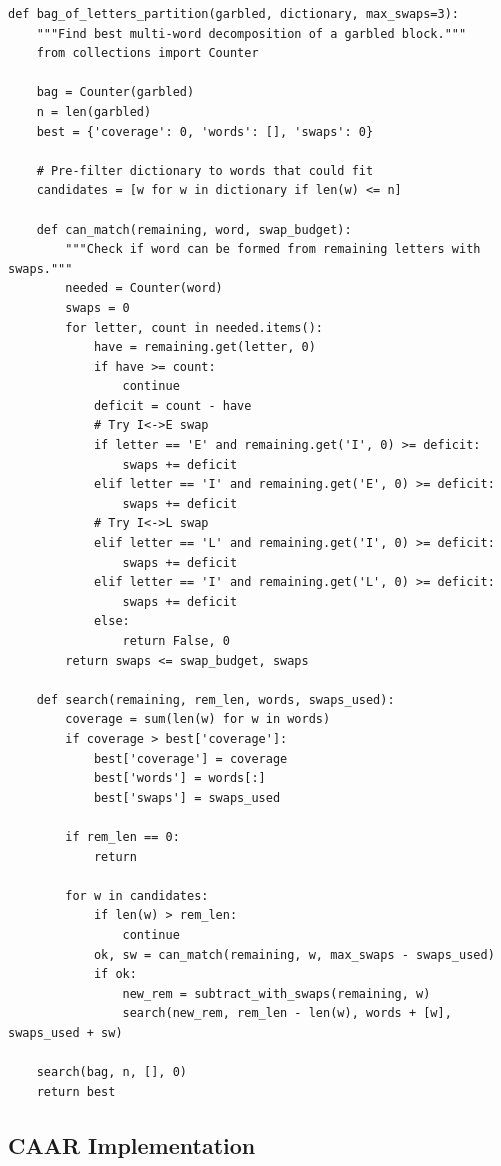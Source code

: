 \documentclass[11pt,a4paper]{article}
\begin{document}
\begin{lstlisting}[style=python]
def bag_of_letters_partition(garbled, dictionary, max_swaps=3):
    """Find best multi-word decomposition of a garbled block."""
    from collections import Counter

    bag = Counter(garbled)
    n = len(garbled)
    best = {'coverage': 0, 'words': [], 'swaps': 0}

    # Pre-filter dictionary to words that could fit
    candidates = [w for w in dictionary if len(w) <= n]

    def can_match(remaining, word, swap_budget):
        """Check if word can be formed from remaining letters with swaps."""
        needed = Counter(word)
        swaps = 0
        for letter, count in needed.items():
            have = remaining.get(letter, 0)
            if have >= count:
                continue
            deficit = count - have
            # Try I<->E swap
            if letter == 'E' and remaining.get('I', 0) >= deficit:
                swaps += deficit
            elif letter == 'I' and remaining.get('E', 0) >= deficit:
                swaps += deficit
            # Try I<->L swap
            elif letter == 'L' and remaining.get('I', 0) >= deficit:
                swaps += deficit
            elif letter == 'I' and remaining.get('L', 0) >= deficit:
                swaps += deficit
            else:
                return False, 0
        return swaps <= swap_budget, swaps

    def search(remaining, rem_len, words, swaps_used):
        coverage = sum(len(w) for w in words)
        if coverage > best['coverage']:
            best['coverage'] = coverage
            best['words'] = words[:]
            best['swaps'] = swaps_used

        if rem_len == 0:
            return

        for w in candidates:
            if len(w) > rem_len:
                continue
            ok, sw = can_match(remaining, w, max_swaps - swaps_used)
            if ok:
                new_rem = subtract_with_swaps(remaining, w)
                search(new_rem, rem_len - len(w), words + [w], swaps_used + sw)

    search(bag, n, [], 0)
    return best
\end{lstlisting}

\subsection{CAAR Implementation}
\end{document}
